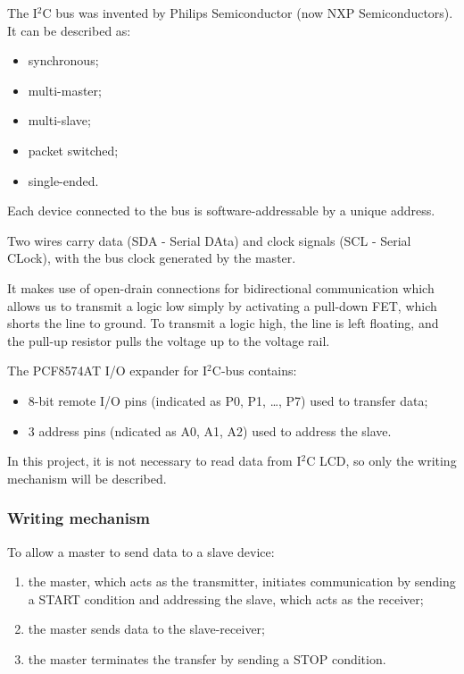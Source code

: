 \documentclass[a4paper, 12pt]{article}
\begin{document}
The I$^2$C bus was invented by Philips Semiconductor (now NXP Semiconductors). It can be described as:
\begin{itemize}
    \item synchronous;
    \item multi-master;
    \item multi-slave;
    \item packet switched;
    \item single-ended.
\end{itemize}

Each device connected to the bus is software-addressable by a unique address.

Two wires carry data (SDA - Serial DAta) and clock signals (SCL - Serial CLock), with the bus clock generated by the master.

It makes use of open-drain connections for bidirectional communication which allows us to transmit a logic low simply by activating a pull-down FET, which shorts the line to ground.
To transmit a logic high, the line is left floating, and the pull-up resistor pulls the voltage up to the voltage rail.

The PCF8574AT I/O expander for I$^2$C-bus contains:
\begin{itemize}
    \item 8-bit remote I/O pins (indicated as P0, P1, \dots, P7) used to transfer data;
    \item 3 address pins (ndicated as A0, A1, A2) used to address the slave.
\end{itemize}

In this project, it is not necessary to read data from I$^2$C LCD, so only the writing mechanism will be described.

\subsubsection{Writing mechanism}

To allow a master to send data to a slave device:
\begin{enumerate}
    \item the master, which acts as the transmitter, initiates communication by sending a START condition and addressing the slave, which acts as the receiver;
    \item the master sends data to the slave-receiver;
    \item the master terminates the transfer by sending a STOP condition.
\end{enumerate}
\end{document}

